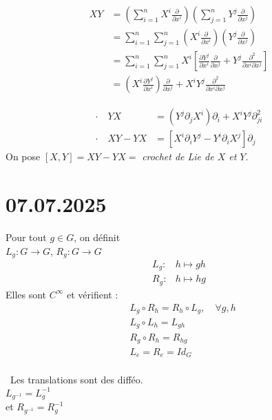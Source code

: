 \documentclass[11pt,a4paper]{article}
\begin{document}
\begin{align*}
	XY &= \left( \sum_{i=1}^n X^i \frac{\partial}{\partial x^i} \right) \left( \sum_{j=1}^n Y^j \frac{\partial}{\partial x^j} \right) \\ 
	&= \sum_{i=1}^n \sum_{j=1}^n \left( X^i \frac{\partial}{\partial x^i} \right) \left( Y^j \frac{\partial}{\partial x^j} \right) \\
	&= \sum_{i=1}^n \sum_{j=1}^n X^i \left[ \frac{\partial Y^j}{\partial x^i} \frac{\partial}{\partial x^j} + Y^j \frac{\partial^2}{\partial x^i \partial x^j} \right] \\
	&= \left( X^i \frac{\partial Y^j}{\partial x^i} \right) \frac{\partial}{\partial x^j} + X^i Y^j \frac{\partial^2}{\partial x^i \partial x^j}
\end{align*}
	
	\begin{align*}
		\cdot \quad YX &= (Y^j \partial_j X^i) \partial_i + X^i Y^j \partial_{ji}^2 \\
		\cdot \quad XY - YX &= \left[ X^i \partial_i Y^j - Y^i \partial_i X^j \right] \partial_j
	\end{align*}
	On pose \([X, Y] = XY - YX =\) \emph{crochet de Lie de \(X\) et \(Y\)}.
	
	\section{07.07.2025}
	Pour tout $g \in G$, on définit \\
	$L_g : G \to G$, $R_g: G \to G$\\
	\[
	\begin{array}{ll}
		L_g : & h \mapsto gh \\
		R_g : & h \mapsto hg
	\end{array}
	\]
	Elles sont $C^\infty$ et vérifient :
	\[
	\begin{aligned}
		& L_g \circ R_h = R_h \circ L_g, \quad \forall g, h \\
		& L_g \circ L_h = L_{gh} \\
		& R_g \circ R_h = R_{hg} \\
		& L_e = R_e = Id_G \\
	\end{aligned}
	\]
	\medskip
	
	\noindent
	\textasteriskcentered~Les translations sont des difféo. \\
	$L_{g^{-1}} = L_g^{-1}$ \\
	et $R_{g^{-1}} = R_g^{-1}$ \\
	
\end{document}
